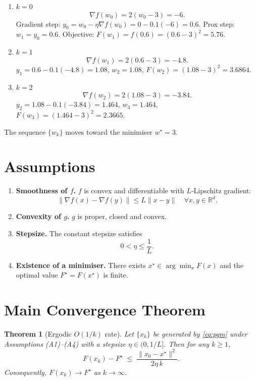 \documentclass{article}
\newtheorem{theorem}{Theorem}
\begin{document}
\begin{enumerate}[label=Iteration \arabic*:, leftmargin=*]
\item $k=0$  
  \[
  \nabla f(w_{0})=2(w_{0}-3)=-6.
  \]
  Gradient step: $y_{0}=w_{0}-\eta\nabla f(w_{0})=0-0.1(-6)=0.6$.  
  Prox step: $w_{1}=y_{0}=0.6$.  
  Objective: $F(w_{1})=f(0.6)=(0.6-3)^{2}=5.76$.
\item $k=1$  
  \[
  \nabla f(w_{1})=2(0.6-3)=-4.8.
  \]
  $y_{1}=0.6-0.1(-4.8)=1.08$, $w_{2}=1.08$, $F(w_{2})=(1.08-3)^{2}=3.6864$.
\item $k=2$  
  \[
  \nabla f(w_{2})=2(1.08-3)=-3.84.
  \]
  $y_{2}=1.08-0.1(-3.84)=1.464$, $w_{3}=1.464$, $F(w_{3})=(1.464-3)^{2}=2.3665$.
\end{enumerate}
The sequence $\{w_{k}\}$ moves toward the minimiser $w^{\star}=3$.

\newpage
\section*{Assumptions}
\begin{enumerate}[label=(A\arabic*)]
\item \textbf{Smoothness of $f$.} $f$ is convex and differentiable with $L$‑Lipschitz gradient:
\[
\|\nabla f(x)-\nabla f(y)\|\le L\|x-y\|\quad\forall x,y\in\mathbb{R}^{d}.
\tag{A1}
\]
\item \textbf{Convexity of $g$.} $g$ is proper, closed and convex.
\item \textbf{Stepsize.} The constant stepsize satisfies
\[
0<\eta\le\frac{1}{L}.
\tag{A3}
\]
\item \textbf{Existence of a minimiser.} There exists $x^{\star}\in\arg\min_{x}F(x)$ and the optimal value $F^{\star}=F(x^{\star})$ is finite.
\end{enumerate}

\section*{Main Convergence Theorem}
\begin{theorem}[Ergodic $O(1/k)$ rate]
\label{thm:rate}
Let $\{x_{k}\}$ be generated by \eqref{eq:pgm} under Assumptions (A1)–(A4) with a stepsize $\eta\in(0,1/L]$. Then for any $k\ge1$,
\[
F(x_{k})-F^{\star}\;\le\;\frac{\|x_{0}-x^{\star}\|^{2}}{2\eta\,k}.
\tag{T1}
\]
Consequently, $F(x_{k})\to F^{\star}$ as $k\to\infty$.
\end{theorem}
\end{document}
